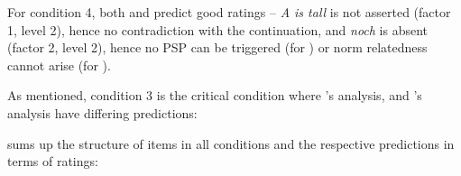\documentclass[output=paper]{langsci/langscibook}
\begin{document}
For condition 4, both \citeauthor{Hofstetter2013} and \citeauthor{umbach2009a_comp} predict good ratings -- \textit{A is tall} is not asserted (factor 1, level 2), hence no contradiction with the continuation, and \textit{noch} is absent (factor 2, level 2), hence no PSP can be triggered (for \citeauthor{Hofstetter2013}) or norm relatedness cannot arise (for \citeauthor{umbach2009a_comp}).

As mentioned, condition 3 is the critical condition where \citeauthor{Hofstetter2013}'s \citeyearpar{Hofstetter2013} analysis, and \citeauthor{umbach2009a_comp}'s \citeyearpar{umbach2009a_comp} analysis have differing predictions:

 sums up the structure of items in all conditions and the respective predictions in terms of ratings:
\end{document}
